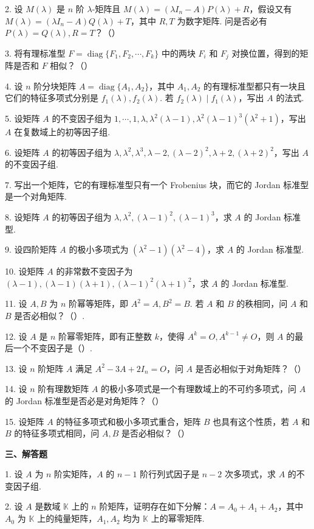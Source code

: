 \documentclass[UTF8,12pt,a4paper,fontset=fandol]{ctexart}
\begin{document}
2. 设 $M(\lambda)$ 是 $n$ 阶 $\lambda$-矩阵且 $M(\lambda)=(\lambda I_n-A)P(\lambda)+R$，假设又有 $M(\lambda)=(\lambda I_n-A)Q(\lambda)+T$，其中 $R,T$ 为数字矩阵. 问是否必有 $P(\lambda)=Q(\lambda),R=T$？（\quad）

3. 将有理标准型 $F=\operatorname{diag}\{F_1,F_2,\cdots,F_k\}$ 中的两块 $F_i$ 和 $F_j$ 对换位置，得到的矩阵是否和 $F$ 相似？（\quad）

4. 设 $n$ 阶分块矩阵 $A=\operatorname{diag}\{A_1,A_2\}$，其中 $A_1,A_2$ 的有理标准型都只有一块且它们的特征多项式分别是 $f_1(\lambda),f_2(\lambda)$. 若 $f_2(\lambda)\mid f_1(\lambda)$，写出 $A$ 的法式.

5. 设矩阵 $A$ 的不变因子组为 $1,\cdots,1,\lambda,\lambda^2(\lambda-1),\lambda^2(\lambda-1)^3(\lambda^2+1)$，写出 $A$ 在复数域上的初等因子组.

6. 设矩阵 $A$ 的初等因子组为 $\lambda,\lambda^2,\lambda^3,\lambda-2,(\lambda-2)^2,\lambda+2,(\lambda+2)^2$，写出 $A$ 的不变因子组.

7. 写出一个矩阵，它的有理标准型只有一个 Frobenius 块，而它的 Jordan 标准型是一个对角矩阵.

8. 设矩阵 $A$ 的初等因子组为 $\lambda,\lambda^2,(\lambda-1)^2,(\lambda-1)^3$，求 $A$ 的 Jordan 标准型.

9. 设四阶矩阵 $A$ 的极小多项式为 $(\lambda^2-1)(\lambda^2-4)$，求 $A$ 的 Jordan 标准型.

10. 设矩阵 $A$ 的非常数不变因子为 $(\lambda-1),(\lambda-1)(\lambda+1),(\lambda-1)^2(\lambda+1)^2$，求 $A$ 的 Jordan 标准型.

11. 设 $A,B$ 为 $n$ 阶幂等矩阵，即 $A^2=A,B^2=B$. 若 $A$ 和 $B$ 的秩相同，问 $A$ 和 $B$ 是否必相似？（\quad）.

12. 设 $A$ 是 $n$ 阶幂零矩阵，即有正整数 $k$，使得 $A^k=O,A^{k-1}\ne O$，则 $A$ 的最后一个不变因子是（\quad）.

13. 设 $n$ 阶矩阵 $A$ 满足 $A^2-3A+2I_n=O$，问 $A$ 是否必相似于对角矩阵？（\quad）

14. 设 $n$ 阶有理数矩阵 $A$ 的极小多项式是一个有理数域上的不可约多项式，问 $A$ 的 Jordan 标准型是否必是对角矩阵？（\quad）

15. 设矩阵 $A$ 的特征多项式和极小多项式重合，矩阵 $B$ 也具有这个性质，若 $A$ 和 $B$ 的特征多项式相同，问 $A,B$ 是否必相似？（\quad）

\noindent\textbf{三、解答题}

1. 设 $A$ 为 $n$ 阶实矩阵，$A$ 的 $n-1$ 阶行列式因子是 $n-2$ 次多项式，求 $A$ 的不变因子组.

2. 设 $A$ 是数域 $\mathbb{K}$ 上的 $n$ 阶矩阵，证明存在如下分解：$A=A_0+A_1+A_2$，其中 $A_0$ 为 $\mathbb{K}$ 上的纯量矩阵，$A_1,A_2$ 均为 $\mathbb{K}$ 上的幂零矩阵.
\end{document}
